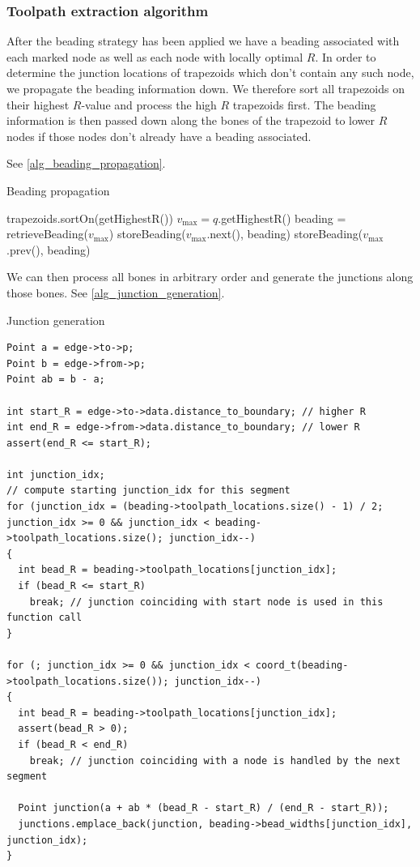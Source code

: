 \subsubsection{Toolpath extraction algorithm}
After the beading strategy has been applied we have a beading associated with each marked node as well as each node with locally optimal $R$.
In order to determine the junction locations of trapezoids which don't contain any such node, we propagate the beading information down.
We therefore sort all trapezoids on their highest $R$-value and process the high $R$ trapezoids first.
The beading information is then passed down along the bones of the trapezoid to lower $R$ nodes if those nodes don't already have a beading associated.

See \cref{alg_beading_propagation}.

\begin{algorithm}
\caption{Beading propagation}
\label{alg_beading_propagation}
\begin{algorithmic}
\State trapezoids.sortOn(getHighestR())
	\State $v_\text{max} = q$.getHighestR()
	\State beading = retrieveBeading($v_\text{max}$)
		\State storeBeading($v_\text{max}$.next(), beading)
	\EndIf
		\State storeBeading($v_\text{max}$.prev(), beading)
	\EndIf
\EndFor
\end{algorithmic}
\end{algorithm}


We can then process all bones in arbitrary order and generate the junctions along those bones.
See \cref{alg_junction_generation}.

\begin{algorithm}
\caption{Junction generation}
\label{alg_junction_generation}
\lstset{language=C++}
\begin{lstlisting}[frame=single]
Point a = edge->to->p;
Point b = edge->from->p;
Point ab = b - a;

int start_R = edge->to->data.distance_to_boundary; // higher R
int end_R = edge->from->data.distance_to_boundary; // lower R
assert(end_R <= start_R);

int junction_idx;
// compute starting junction_idx for this segment
for (junction_idx = (beading->toolpath_locations.size() - 1) / 2; junction_idx >= 0 && junction_idx < beading->toolpath_locations.size(); junction_idx--)
{
  int bead_R = beading->toolpath_locations[junction_idx];
  if (bead_R <= start_R)
    break; // junction coinciding with start node is used in this function call
}

for (; junction_idx >= 0 && junction_idx < coord_t(beading->toolpath_locations.size()); junction_idx--)
{
  int bead_R = beading->toolpath_locations[junction_idx];
  assert(bead_R > 0);
  if (bead_R < end_R)
    break; // junction coinciding with a node is handled by the next segment
  
  Point junction(a + ab * (bead_R - start_R) / (end_R - start_R));
  junctions.emplace_back(junction, beading->bead_widths[junction_idx], junction_idx);
}
\end{lstlisting}
\end{algorithm}



